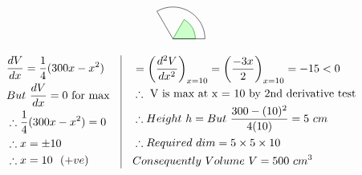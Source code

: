 \documentclass[17pt]{extarticle}
\begin{document}
\begin{fleqn}
\begin{equation}
\begin{alignedat}{4}
\begin{tikzpicture}
\filldraw[fill=green!20,draw=green!50!black] (0,0) -- (0.7,0) arc (0:60:0.7) -- cycle;
\draw (0,0) -- (1,0) arc (0:120:1) -- cycle;
\end{tikzpicture}
\end{alignedat}
\end{equation}
\quad


\begin{equation} \nonumber
\begin{alignedat}{4}
& \frac{dV}{dx}=\frac{1}{4}(300x - x^2) \\
& But\  \frac{dV}{dx}= 0 \text{ for max}\\
& \therefore \frac{1}{4}(300x - x^2)=0\\
& \therefore x = \pm 10\\
& \therefore x = 10 \ \ (+ve)
\end{alignedat}
\quad
\vrule
\quad
\begin{alignedat}{4}
&= \left(\frac{d^2V}{dx^2}\right)_{x=10}=\left(\frac{-3x}{2}\right)_{x=10} = -15<0\\
& \therefore \text{ V is max at x = 10 by 2nd derivative test}\\
& \therefore Height\  h=But\  \frac{300 - (10)^2}{4(10)}= 5\ cm\\
& \therefore Required\  dim = 5 \times  5 \times 10 \\
& Consequently \ Volume\ V = 500 \ cm^3 \\
\end{alignedat}
\end{equation}



\end{fleqn}
\end{document}
